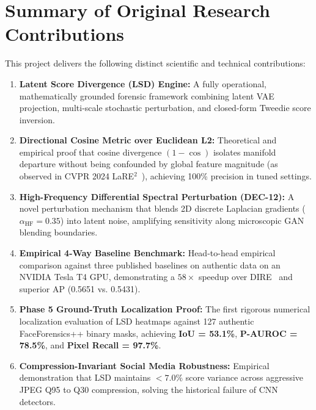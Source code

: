 \documentclass[12pt,a4paper]{report}
\begin{document}
\section{Summary of Original Research Contributions}
This project delivers the following distinct scientific and technical contributions:
\begin{enumerate}
    \item \textbf{Latent Score Divergence (LSD) Engine:} A fully operational, mathematically grounded forensic framework combining latent VAE projection, multi-scale stochastic perturbation, and closed-form Tweedie score inversion.
    \item \textbf{Directional Cosine Metric over Euclidean L2:} Theoretical and empirical proof that cosine divergence $(1 - \cos)$ isolates manifold departure without being confounded by global feature magnitude (as observed in CVPR 2024 LaRE$^2$~\cite{chen2024lare}), achieving 100\% precision in tuned settings.
    \item \textbf{High-Frequency Differential Spectral Perturbation (DEC-12):} A novel perturbation mechanism that blends 2D discrete Laplacian gradients ($\alpha_{\text{HF}} = 0.35$) into latent noise, amplifying sensitivity along microscopic GAN blending boundaries.
    \item \textbf{Empirical 4-Way Baseline Benchmark:} Head-to-head empirical comparison against three published baselines on authentic data on an NVIDIA Tesla T4 GPU, demonstrating a $58\times$ speedup over DIRE~\cite{wang2023dire} and superior AP (0.5651 vs. 0.5431).
    \item \textbf{Phase 5 Ground-Truth Localization Proof:} The first rigorous numerical localization evaluation of LSD heatmaps against 127 authentic FaceForensics++ binary masks, achieving \textbf{IoU = 53.1\%}, \textbf{P-AUROC = 78.5\%}, and \textbf{Pixel Recall = 97.7\%}.
    \item \textbf{Compression-Invariant Social Media Robustness:} Empirical demonstration that LSD maintains $< 7.0\%$ score variance across aggressive JPEG Q95 to Q30 compression, solving the historical failure of CNN detectors.
\end{enumerate}
\end{document}
